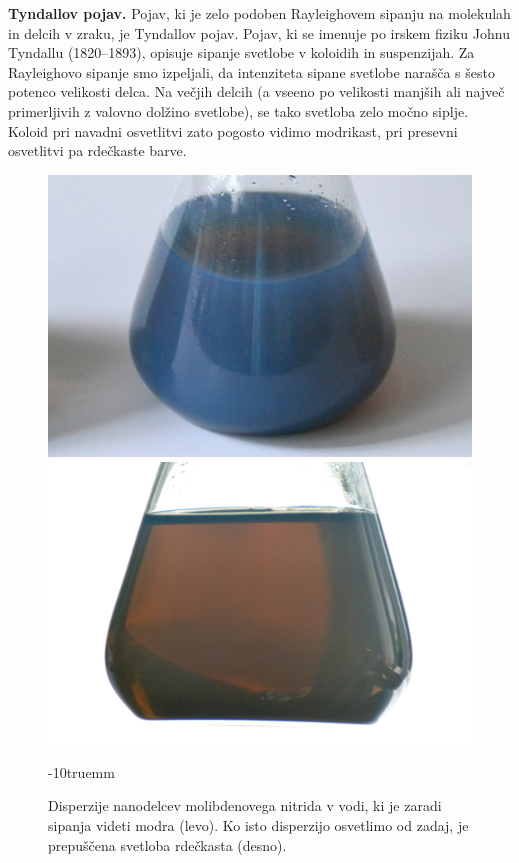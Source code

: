 \begin{example}{\bf Tyndallov pojav.} Pojav, ki je zelo podoben Rayleighovem sipanju
na molekulah in delcih v zraku, je Tyndallov pojav. Pojav, ki se imenuje po irskem fiziku
Johnu Tyndallu (1820--1893), opisuje sipanje svetlobe v koloidih in suspenzijah. Za Rayleighovo
sipanje smo izpeljali, da intenziteta sipane svetlobe narašča s šesto potenco velikosti
delca. Na večjih delcih (a vseeno po velikosti manjših ali največ primerljivih z valovno dolžino 
svetlobe), se tako svetloba zelo močno siplje. Koloid pri navadni 
osvetlitvi zato pogosto vidimo modrikast, pri presevni osvetlitvi pa rdečkaste barve.
\begin{figure}[!h]
\centering
\includegraphics[width=7truecm]{slike/07_Mo2N1.jpg}\hfill
\includegraphics[width=7truecm]{slike/07_Mo2N2.jpg}
\caption{Disperzije nanodelcev molibdenovega nitrida v vodi, ki je zaradi sipanja
videti modra (levo). Ko isto disperzijo osvetlimo od zadaj, je prepuščena svetloba rdečkasta
(desno).}
\label{fig:07_Tyndall}
\vglue-10truemm
\end{figure}

\end{example}

